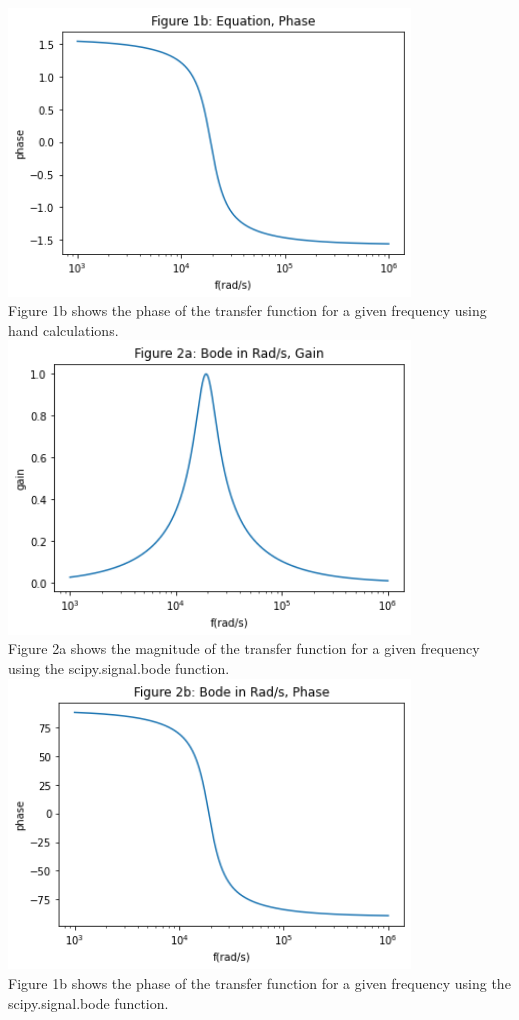 \documentclass[12pt,a4paper]{article}
\begin{document}
\includegraphics[width=0.8\textwidth]{Figure 1b.png}\\
Figure 1b shows the phase of the transfer function for a given frequency using hand calculations.\\

\includegraphics[width=0.8\textwidth]{Figure 2a.png}\\
Figure 2a shows the magnitude of the transfer function for a given frequency using the scipy.signal.bode function.\\

\includegraphics[width=0.8\textwidth]{Figure 2b.png}\\
Figure 1b shows the phase of the transfer function for a given frequency using the scipy.signal.bode function.\\
\end{document}

